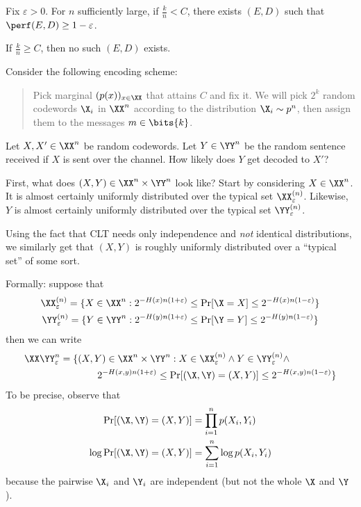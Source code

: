 \documentclass[class=co432,notes,tikz]{agony}
\begin{document}
\begin{theorem}
  Fix $\varepsilon > 0$. For $n$ sufficiently large, if $\frac k n < C$,
  there exists $(E, D)$ such that $\perf(E,D) \geq 1-\varepsilon$.

  If $\frac k n \geq C$, then no such $(E, D)$ exists.
\end{theorem}
\begin{prf}
  Consider the following encoding scheme:
  \begin{quote}
    Pick marginal $(p(x))_{x\in\XX}$ that attains $C$ and fix it.
    We will pick $2^k$ \iid random codewords $\X_i$ in $\XX^n$
    according to the distribution $\X_i \sim p^n$,
    then assign them to the messages $m \in \bits{k}$.
  \end{quote}
  Let $X,X' \in \XX^n$ be random codewords.
  Let $Y \in \YY^n$ be the random sentence received if $X$ is sent over the channel.
  How likely does $Y$ get decoded to $X'$?

  First, what does $(X,Y) \in \XX^n \times \YY^n$ look like?
  Start by considering $X \in \XX^n$.
  It is almost certainly uniformly distributed over the typical set $\XX_\varepsilon^{(n)}$.
  Likewise, $Y$ is almost certainly uniformly distributed over the typical set $\YY_\varepsilon^{(n)}$.

  Using the fact that CLT needs only independence and \emph{not}
  identical distributions, we similarly get that $(X,Y)$
  is roughly uniformly distributed over a ``typical set'' of some sort.

  Formally: suppose that
  \begin{gather*}
    \XX_\varepsilon^{(n)} = \{ X \in \XX^n : 2^{-H(x)n(1+\varepsilon)} \leq \Pr[\X=X] \leq 2^{-H(x)n(1-\varepsilon)}\} \\
    \YY_\varepsilon^{(n)} = \{ Y \in \YY^n : 2^{-H(y)n(1+\varepsilon)} \leq \Pr[\Y=Y] \leq 2^{-H(y)n(1-\varepsilon)}\}
  \end{gather*}
  then we can write
  \begin{align*}
    \XX\YY_{\varepsilon}^n = \{
     & (X,Y) \in \XX^n\times\YY^n : X \in \XX_\varepsilon^{(n)} \land Y \in \YY_\varepsilon^{(n)} \land \\
     & \qquad 2^{-H(x,y)n(1+\varepsilon)} \leq \Pr[(\X,\Y) = (X,Y)] \leq 2^{-H(x,y)n(1-\varepsilon)}\}
  \end{align*}
  To be precise, observe that
  \begin{align*}
    \Pr[(\X,\Y) = (X,Y)]      & = \prod_{i=1}^n p(X_i, Y_i)     \\
    \log \Pr[(\X,\Y) = (X,Y)] & = \sum_{i=1}^n \log p(X_i, Y_i)
  \end{align*}
  because the pairwise $\X_i$ and $\Y_i$ are independent (but not the whole $\X$ and $\Y$).


\end{prf}
\end{document}
